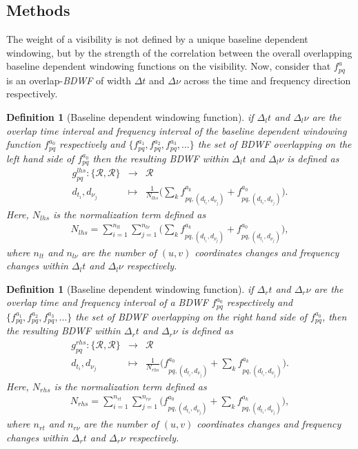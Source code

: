 \documentclass[useAMS,usenatbib]{mn2e}
\newtheorem{definition}[theorem]{Definition}
\begin{document}
\subsection{Methods}
The weight of a visibility is not defined by a unique baseline dependent windowing, but by the strength of the correlation between the 
overall  overlapping baseline dependent windowing functions on the visibility. Now, consider that $f^{a}_{pq}$ is an overlap-\textit{BDWF} 
of width  $\Delta t$ and $\Delta \nu$ across the time and frequency direction respectively.
\begin{definition}[Baseline dependent windowing function]
\label{def:4}
if $\Delta_l t$ and $\Delta_l \nu$ are the overlap time interval and frequency interval of the baseline dependent windowing function  
$f_{pq}^{a_0}$ respectively  and $\Big\{f_{pq}^{a_1},f_{pq}^{a_2},f_{pq}^{a_3}, \dots \Big\}$ the set of \textit{BDWF} overlapping  on the 
\textit{left hand side} of $f_{pq}^{a_0}$ then the resulting \textit{BDWF} within $\Delta_l t$ and $\Delta_l \nu$ is defined as
\begin{eqnarray*}
 g^{lhs}_{pq}: \{\mathbf{\mathcal{R}},\mathbf{\mathcal{R}}\} &\rightarrow& \mathbf{\mathcal{R}}\\
                   d_{t_i},d_{\nu_j} &\mapsto& \frac{1}{N_{lhs}}\Bigg(\sum_{k}f_{pq,(d_{t_i},d_{\nu_j})}^{a_k} 
+ f_{pq,(d_{t_i},d_{\nu_j})}^{a_0}\Bigg).
\end{eqnarray*}
Here, $N_{lhs}$ is the normalization term defined as
\begin{eqnarray*}
N_{lhs}=\sum_{i=1}^{n_{lt}}\sum_{j=1}^{n_{l\nu}}\Bigg(\sum_{k}f_{pq,(d_{t_i},d_{\nu_j})}^{a_k} + f_{pq,(d_{t_i},d_{\nu_j})}^{a_0} \Bigg),
\end{eqnarray*}
where $n_{lt}$ and $n_{l\nu}$ are the number of $(u,v)$ coordinates changes and frequency changes  within $\Delta_l t$ and $\Delta_l \nu$ 
respectively.
\end{definition}
\begin{definition}[Baseline dependent windowing function]
 \label{def:4}
 if $\Delta_r t$ and $\Delta_r \nu$ are the overlap time and frequency interval of a \textit{BDWF} $f_{pq}^{a_0}$ 
respectively and  $\Big\{f_{pq}^{a_1},f_{pq}^{a_2},f_{pq}^{a_3}, \dots \Big\}$ the set of \textit{BDWF} overlapping on the \textit{right 
hand side} of $f_{pq}^{a_0}$, then the 
resulting \textit{BDWF} within $\Delta_r t$ and $\Delta_r \nu$ is defined as
\begin{eqnarray*}
 g^{rhs}_{pq}: \{\mathbf{\mathcal{R}},\mathbf{\mathcal{R}}\} &\rightarrow& \mathbf{\mathcal{R}}\\
                   d_{t_i},d_{\nu_j} &\mapsto& 
\frac{1}{N_{rhs}}\Bigg (f_{pq,(d_{t_i},d_{\nu_j})}^{a_0}+\sum_{k}f_{pq,(d_{t_i},d_{\nu_j})}^{a_k}\Bigg ).
\end{eqnarray*}
Here, $N_{rhs}$ is the normalization term defined as
\begin{eqnarray*}
N_{rhs}=\sum_{i=1}^{n_{rt}}\sum_{j=1}^{n_{r\nu}}\Bigg(f_{pq,(d_{t_i},d_{\nu_j})}^{a_0} + \sum_{k}f_{pq,(d_{t_i},d_{\nu_j})}^{a_k}\Bigg),
\end{eqnarray*}
where $n_{rt}$ and $n_{r\nu}$ are the number of $(u,v)$ coordinates changes and frequency changes  within $\Delta_r t$ and $\Delta_r \nu$ 
respectively.
\end{definition}
\end{document}
